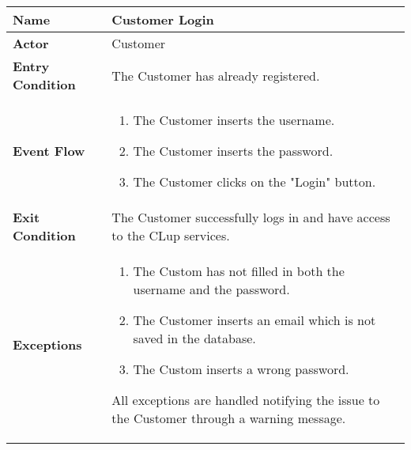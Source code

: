 \begin{center}
    \begin{tabular}{ | l | p{11cm} |}
    \hline
    \textbf{Name} & Customer Login \\ \hline
    \textbf{Actor} & Customer \\ \hline
    \textbf{Entry Condition} & The Customer has already registered. \\ \hline
    \textbf{Event Flow} & \begin{enumerate}
					\item The Customer inserts the username.
					\item The Customer inserts the password.
					\item The Customer clicks on the "Login" button.
		            \end{enumerate}\\  \hline
    \textbf{Exit Condition} & The Customer successfully logs in and have access to the CLup services.  \\ \hline
    \textbf{Exceptions} & \begin{enumerate}
					\item The Custom has not filled in both the username and the password.
					\item The Customer inserts an email which is not saved in the database.
					\item The Custom inserts a wrong password.
		            \end{enumerate} All exceptions are handled notifying the issue to the Customer through a warning message.\\  \hline
				
    \end{tabular}
\end{center} 

